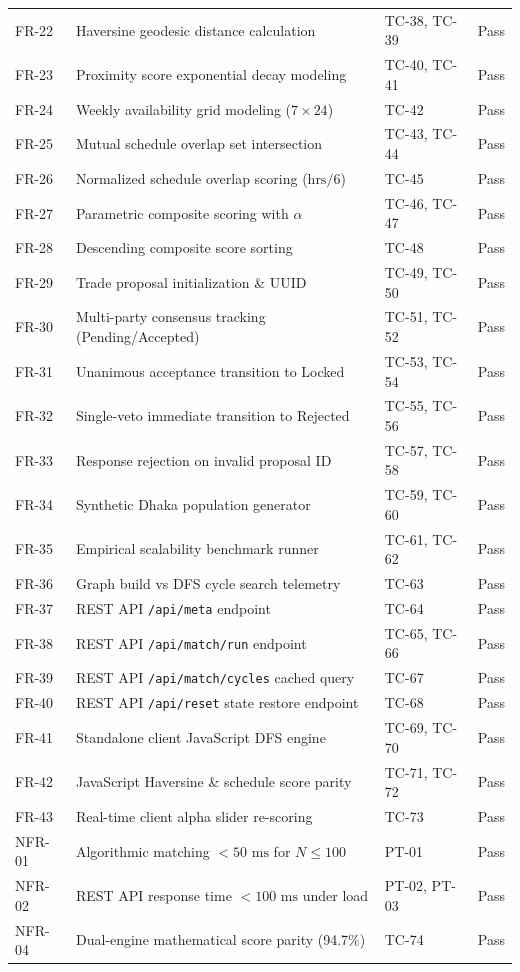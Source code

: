 \documentclass[12pt,a4paper]{report}
\begin{document}
\begin{longtable}{p{1.4cm} p{7.5cm} p{3.8cm} c}
FR-22 & Haversine geodesic distance calculation & TC-38, TC-39 & Pass \\
FR-23 & Proximity score exponential decay modeling & TC-40, TC-41 & Pass \\
FR-24 & Weekly availability grid modeling ($7 \times 24$) & TC-42 & Pass \\
FR-25 & Mutual schedule overlap set intersection & TC-43, TC-44 & Pass \\
FR-26 & Normalized schedule overlap scoring ($\text{hrs}/6$) & TC-45 & Pass \\
FR-27 & Parametric composite scoring with $\alpha$ & TC-46, TC-47 & Pass \\
FR-28 & Descending composite score sorting & TC-48 & Pass \\
FR-29 & Trade proposal initialization \& UUID & TC-49, TC-50 & Pass \\
FR-30 & Multi-party consensus tracking (Pending/Accepted) & TC-51, TC-52 & Pass \\
FR-31 & Unanimous acceptance transition to Locked & TC-53, TC-54 & Pass \\
FR-32 & Single-veto immediate transition to Rejected & TC-55, TC-56 & Pass \\
FR-33 & Response rejection on invalid proposal ID & TC-57, TC-58 & Pass \\
FR-34 & Synthetic Dhaka population generator & TC-59, TC-60 & Pass \\
FR-35 & Empirical scalability benchmark runner & TC-61, TC-62 & Pass \\
FR-36 & Graph build vs DFS cycle search telemetry & TC-63 & Pass \\
FR-37 & REST API \texttt{/api/meta} endpoint & TC-64 & Pass \\
FR-38 & REST API \texttt{/api/match/run} endpoint & TC-65, TC-66 & Pass \\
FR-39 & REST API \texttt{/api/match/cycles} cached query & TC-67 & Pass \\
FR-40 & REST API \texttt{/api/reset} state restore endpoint & TC-68 & Pass \\
FR-41 & Standalone client JavaScript DFS engine & TC-69, TC-70 & Pass \\
FR-42 & JavaScript Haversine \& schedule score parity & TC-71, TC-72 & Pass \\
FR-43 & Real-time client alpha slider re-scoring & TC-73 & Pass \\
NFR-01 & Algorithmic matching $< 50\text{ ms}$ for $N \le 100$ & PT-01 & Pass \\
NFR-02 & REST API response time $< 100\text{ ms}$ under load & PT-02, PT-03 & Pass \\
NFR-04 & Dual-engine mathematical score parity (94.7\%) & TC-74 & Pass \\
\bottomrule
\end{longtable}
\end{document}

